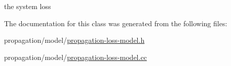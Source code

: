 the system loss 



The documentation for this class was generated from the following files\+:\begin{DoxyCompactItemize}
\item 
propagation/model/\hyperlink{propagation-loss-model_8h}{propagation-\/loss-\/model.\+h}\item 
propagation/model/\hyperlink{propagation-loss-model_8cc}{propagation-\/loss-\/model.\+cc}\end{DoxyCompactItemize}
